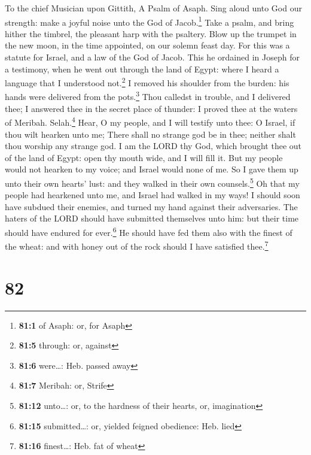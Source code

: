 To the chief Musician upon Gittith, A Psalm of Asaph. 
Sing aloud unto God our strength: make a joyful noise unto the God of
Jacob.\footnote{\textbf{81:1} of Asaph: or, for Asaph} 
Take a psalm, and bring hither the timbrel, the pleasant harp with the
psaltery.  Blow up the trumpet in the new moon, in the
time appointed, on our solemn feast day.  For this was a
statute for Israel, and a law of the God of Jacob.  This
he ordained in Joseph for a testimony, when he went out through the land
of Egypt: where I heard a language that I understood not.\footnote{\textbf{81:5}
  through: or, against}  I removed his shoulder from the
burden: his hands were delivered from the pots.\footnote{\textbf{81:6}
  were\ldots: Heb. passed away}  Thou calledst in trouble,
and I delivered thee; I answered thee in the secret place of thunder: I
proved thee at the waters of Meribah. Selah.\footnote{\textbf{81:7}
  Meribah: or, Strife}  Hear, O my people, and I will
testify unto thee: O Israel, if thou wilt hearken unto me;
 There shall no strange god be in thee; neither shalt thou
worship any strange god.  I am the LORD thy God, which
brought thee out of the land of Egypt: open thy mouth wide, and I will
fill it.  But my people would not hearken to my voice;
and Israel would none of me.  So I gave them up unto
their own hearts' lust: and they walked in their own
counsels.\footnote{\textbf{81:12} unto\ldots: or, to the hardness of
  their hearts, or, imagination}  Oh that my people had
hearkened unto me, and Israel had walked in my ways!  I
should soon have subdued their enemies, and turned my hand against their
adversaries.  The haters of the LORD should have
submitted themselves unto him: but their time should have endured for
ever.\footnote{\textbf{81:15} submitted\ldots: or, yielded feigned
  obedience: Heb. lied}  He should have fed them also
with the finest of the wheat: and with honey out of the rock should I
have satisfied thee.\footnote{\textbf{81:16} finest\ldots: Heb. fat of
  wheat}

\hypertarget{section-81}{%
\section{82}\label{section-81}}

